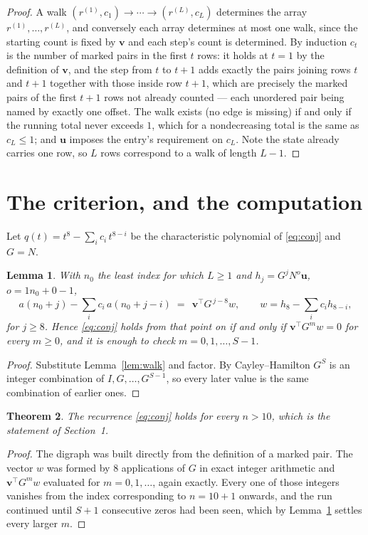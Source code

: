 \documentclass[11pt,a4paper]{article}
\theoremstyle{plain}
\newtheorem{theorem}{Theorem}
\newtheorem{lemma}[theorem]{Lemma}
\theoremstyle{definition}
\begin{document}
\begin{proof}
A walk $(r^{(1)},c_1)\to\cdots\to(r^{(L)},c_L)$ determines the array
$r^{(1)},\dots,r^{(L)}$, and conversely each array determines at most one walk, since the
starting count is fixed by $\mathbf{v}$ and each step's count is determined. By induction
$c_t$ is the number of marked pairs in the first $t$ rows: it holds at $t=1$ by the
definition of $\mathbf{v}$, and the step from $t$ to $t+1$ adds exactly the pairs joining
rows $t$ and $t+1$ together with those inside row $t+1$, which are precisely the marked
pairs of the first $t+1$ rows not already counted --- each unordered pair being named by
exactly one offset. The walk exists (no edge is missing) if and only if the running total
never exceeds $1$, which for a nondecreasing total is the same as $c_L\le1$; and
$\mathbf{u}$ imposes the entry's requirement on $c_L$. Note the state already carries one
row, so $L$ rows correspond to a walk of length $L-1$.
\end{proof}

\section{The criterion, and the computation}

Let $q(t)=t^{8}-\sum_i c_i\,t^{8-i}$ be the characteristic polynomial of
\eqref{eq:conj} and $G=N$.

\begin{lemma}\label{lem:crit}
With $n_0$ the least index for which $L\ge1$ and $h_j=G^{j}N^{o}\mathbf{u}$,
$o=1n_0+0-1$,
\[
a(n_0+j)-\sum_i c_i\,a(n_0+j-i)\;=\;\,\mathbf{v}^{\!\top}G^{\,j-8}w,
\qquad w=h_{8}-\sum_i c_i h_{8-i},
\]
for $j\ge8$. Hence \eqref{eq:conj} holds from that point on if and only if
$\mathbf{v}^{\!\top}G^{m}w=0$ for every $m\ge0$, and it is enough to check
$m=0,1,\dots,S-1$.
\end{lemma}

\begin{proof}
Substitute Lemma~\ref{lem:walk} and factor. By Cayley--Hamilton $G^{S}$ is an integer
combination of $I,G,\dots,G^{S-1}$, so every later value is the same combination of earlier
ones.
\end{proof}

\begin{theorem}
The recurrence \eqref{eq:conj} holds for every $n>10$, which is the statement of
Section~1.
\end{theorem}

\begin{proof}
The digraph was built directly from the definition of a marked pair. The vector $w$ was
formed by $8$ applications of $G$ in exact integer arithmetic and
$\mathbf{v}^{\!\top}G^{m}w$ evaluated for $m=0,1,\dots$, again exactly. Every one of
those integers vanishes from the index corresponding to $n=10+1$ onwards, and the run
continued until $S+1$ consecutive zeros had been seen, which by Lemma~\ref{lem:crit}
settles every larger $m$.
\end{proof}
\end{document}
